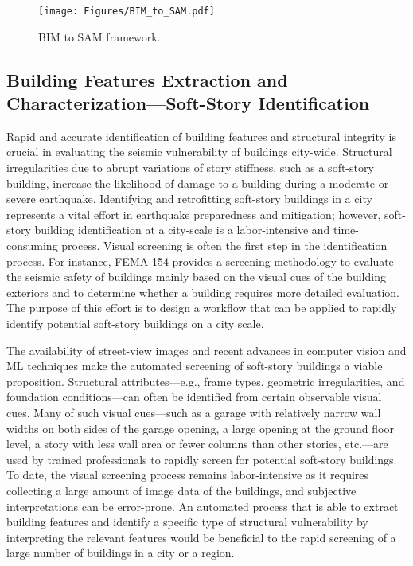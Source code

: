 \begin{figure}[htb]
    \centering
    \texttt{[image: Figures/BIM\_to\_SAM.pdf]}
    \caption{BIM to SAM framework.}
    \label{fig:BIM_to_SAM}
\end{figure}

\subsection{Building Features Extraction and Characterization---Soft-Story Identification}

Rapid and accurate identification of building features and structural integrity is crucial in evaluating the seismic vulnerability of buildings city-wide. Structural irregularities due to abrupt variations of story stiffness, such as a soft-story building, increase the likelihood of damage to a building during a moderate or severe earthquake. Identifying and retrofitting soft-story buildings in a city represents a vital effort in earthquake preparedness and mitigation; however, soft-story building identification at a city-scale is a labor-intensive and time-consuming process. Visual screening is often the first step in the identification process. For instance, FEMA 154 \citep{atc2015rapid} provides a screening methodology to evaluate the seismic safety of buildings mainly based on the visual cues of the building exteriors and to determine whether a building requires more detailed evaluation. The purpose of this effort is to design a workflow that can be applied to rapidly identify potential soft-story buildings on a city scale. 

The availability of street-view images and recent advances in computer vision and ML techniques make the automated screening of soft-story buildings a viable proposition. Structural attributes---e.g., frame types, geometric irregularities, and foundation conditions---can often be identified from certain observable visual cues. Many of such visual cues---such as a garage with relatively narrow wall widths on both sides of the garage opening, a large opening at the ground floor level, a story with less wall area or fewer columns than other stories, etc.---are used by trained professionals to rapidly screen for potential soft-story buildings. To date, the visual screening process remains labor-intensive as it requires collecting a large amount of image data of the buildings, and subjective interpretations can be error-prone. An automated process that is able to extract building features and identify a specific type of structural vulnerability by interpreting the relevant features would be beneficial to the rapid screening of a large number of buildings in a city or a region. 


